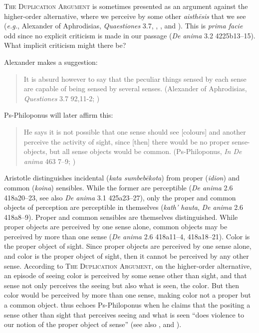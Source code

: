 \textsc{The Duplication Argument} is sometimes presented as an argument against the higher-order alternative, where we perceive by some other \emph{aisthēsis} that we see (\emph{e.g.}, Alexander of Aphrodisias, \emph{Quaestiones} 3.7, \citealt[435]{Hicks:1907uq}, \citealt[121]{Hamlyn:1961ys}, and \citealt[275]{Ross:1961uq}). This is \emph{prima facie} odd since no explicit criticism is made in our passage (\emph{De anima} 3.2 4225b13–15). What implicit criticism might there be?

Alexander makes a suggestion:
\begin{quote}
	It is absurd  however to say that the peculiar things sensed by each sense are capable of being sensed by several senses. (Alexander of Aphrodisias, \emph{Questiones} 3.7 92,11-2; \citealt[54]{Sharples:1994aa})
\end{quote}
Ps-Philoponus will later affirm this:
\begin{quote}
	He says it is not possible that one sense should see [colours] and another perceive the activity of sight, since [then] there would be no proper sense-objects, but all sense objects would be common. (Ps-Philoponus, \emph{In De anima} 463 7–9; \citealt[38]{Charlton:2013aa})
\end{quote}
Aristotle distinguishes incidental (\emph{kata sumbebēkota}) from proper (\emph{idion}) and common (\emph{koina}) sensibles. While the former are perceptible (\emph{De anima} 2.6 418a20–23, see also \emph{De anima} 3.1 425a23–27), only the proper and common objects of perception are perceptible in themselves (\emph{kath’ hauta}, \emph{De anima} 2.6 418a8–9). Proper and common sensibles are themselves distinguished. While proper objects are perceived by one sense alone, common objects may be perceived by more than one sense (\emph{De anima} 2.6 418a11–4, 418a18–21). Color is the proper object of sight. Since proper objects are perceived by one sense alone, and color is the proper object of sight, then it cannot be perceived by any other sense. According to \textsc{The Duplication Argument}, on the higher-order alternative, an episode of seeing color is perceived by some sense other than sight, and that sense not only perceives the seeing but also what is seen, the color. But then color would be perceived by more than one sense, making color not a proper but a common object. \citet[44]{Kosman:2014ab} thus echoes Ps-Philoponus when he claims that the positing a sense other than sight that perceives seeing and what is seen ``does violence to our notion of the proper object of sense'' (see also \citealt[121]{Hamlyn:1961ys}, and \citealt[275]{Ross:1961uq}).

